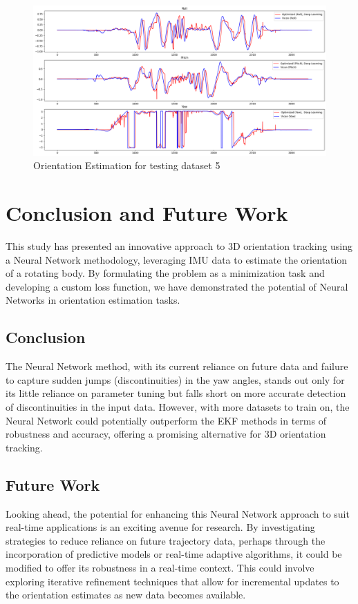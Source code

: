 \documentclass[conference]{IEEEtran}
\begin{document}
\begin{figure}[htbp]
  \centerline{\includegraphics[width=1.0\textwidth]{images/dataset_5.png}}
\caption{Orientation Estimation for testing dataset 5}
\label{fig:dataset_5}
\end{figure}

\section{Conclusion and Future Work}

This study has presented an innovative approach to 3D orientation tracking using a Neural Network methodology, leveraging IMU data to estimate the orientation of a rotating body. By formulating the problem as a minimization task and developing a custom loss function, we have demonstrated the potential of Neural Networks in orientation estimation tasks.

\subsection{Conclusion}
The Neural Network method, with its current reliance on future data and failure to capture sudden jumps (discontinuities) in the yaw angles, stands out only for its little reliance on parameter tuning but falls short on more accurate detection of discontinuities in the input data. However, with more datasets to train on, the Neural Network could potentially outperform the EKF methods in terms of robustness and accuracy, offering a promising alternative for 3D orientation tracking.

\subsection{Future Work}
Looking ahead, the potential for enhancing this Neural Network approach to suit real-time applications is an exciting
avenue for research. By investigating strategies to reduce reliance on future trajectory data, perhaps through the
incorporation of predictive models or real-time adaptive algorithms, it could be modified to offer its robustness in a real-time context. This could involve exploring iterative refinement techniques that allow for incremental updates to the orientation estimates as new data becomes available.
\end{document}
